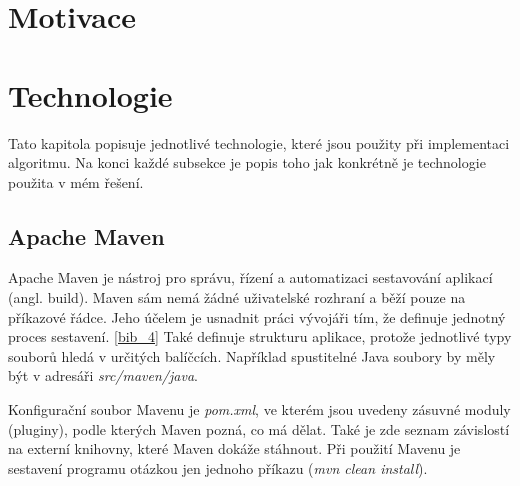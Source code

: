\documentclass[
  digital, %
  table,   %
  nolof,     %
  nolot,     %
  twoside,
  nocover,
  monochrome,
  12pt
]{fithesis3}
\begin{document}
\section{Motivace}
\section{Technologie}
Tato kapitola popisuje jednotlivé technologie, které jsou použity při implementaci algoritmu. Na konci každé subsekce je popis toho jak konkrétně je technologie použita v mém řešení.

\subsection{Apache Maven}
Apache Maven je nástroj pro správu, řízení a automatizaci sestavování aplikací (angl. build). Maven sám nemá žádné uživatelské rozhraní a běží pouze na příkazové řádce. Jeho účelem je usnadnit práci vývojáři tím, že definuje jednotný proces sestavení. \ref{bib_4} Také definuje strukturu aplikace, protože jednotlivé typy souborů hledá v určitých balíčcích. Například spustitelné Java soubory by měly být v adresáři \textit{src/maven/java}.

Konfigurační soubor Mavenu je \textit{pom.xml}, ve kterém jsou uvedeny zásuvné moduly (pluginy), podle kterých Maven pozná, co má dělat. Také je zde seznam závislostí na externí knihovny, které Maven dokáže stáhnout. Při použití Mavenu je sestavení programu otázkou jen jednoho příkazu (\textit{mvn clean install}).
\end{document}
